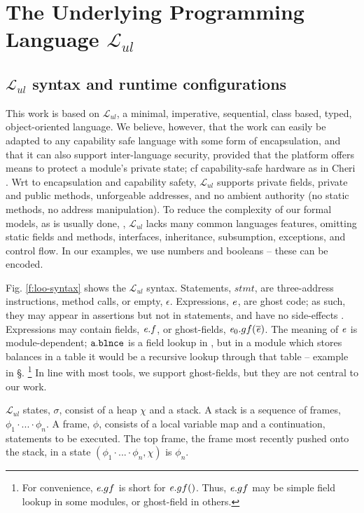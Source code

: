\renewcommand{\LangOO}{\ensuremath{{\mathcal{L}}_{ul}}\xspace }

\section{The Underlying Programming Language \LangOO}  
\label{sect:underlying}

\subsection{\LangOO syntax and runtime configurations}
\label{sub:Loo} 
This work is based on \LangOO, a {minimal}, imperative, sequential,  class based, typed, object-oriented language. 
We believe, however, that the work can easily be adapted to any capability safe language with some form of encapsulation,
and that it can also support inter-language security, provided that the 
platform offers means to protect a module’s private state; cf capability-safe hardware as in Cheri \cite{davis2019cheriabi}.
Wrt to encapsulation and  capability safety,  \LangOO supports private fields, private and public methods, unforgeable addresses, and no ambient authority (no static methods, no address manipulation).
To reduce the complexity of our formal models, as is usually done, \eg \cite{IgaPieWadTOPLAS01,DietlDrossopoulouMueller07a,ParBiePOPL05},  \LangOO lacks many common languages features, omitting static fields and methods, interfaces,
inheritance, subsumption, exceptions, and control flow.  
{In our examples, we use numbers and booleans -- these can be encoded.}
 
Fig. \ref{f:loo-syntax} shows the   \LangOO syntax. {Statements, $stmt$, are three-address instructions,   method calls, or empty, $\epsilon$.}  
Expressions, $\mathit{e}$, are ghost code;  as such, they may appear in assertions but not in statements, and have no side-effects \cite{ghost,ghost:spirit}.
Expressions  may contain fields, $\mathit{e}.f$, or ghost-fields, ${\mathit{e}_0.gf(\overline {\mathit{e}})}$.
The meaning of $\mathit{e}$ is module-dependent; \eg$\mbox{\normalfont{\texttt{a}}}.\mbox{\normalfont{\texttt{\mbox{\normalfont{\texttt{blnce}}}}}}$   is a field lookup  in \ModA , but in a module which stores balances in a table it would be a recursive lookup through that table  -- \cf example   in \S {}. 
  \footnote
{For convenience,   $\mathit{e}.gf$ is short for $\mathit{e}.gf()$. Thus,  $\mathit{e}.gf$ may be simple field lookup  in some modules, or  ghost-field  in others. }
In line with most tools, we support ghost-fields, but they are not central to our work.
 

\LangOO states, $\sigma$,  consist of a  heap $\chi$ and a stack. 
{A stack  is a sequence of frames, $\phi_1\!\cdot\!...\!\cdot\! \phi_n$.}
A  frame, $\phi$, consists of a local variable map and a continuation,   
statements to be executed.
The top frame, \ie  the frame most recently pushed onto the stack,  in a state $(\phi_1\!\cdot\!...\!\cdot\! \phi_n, \chi)$ is $\phi_n$.



